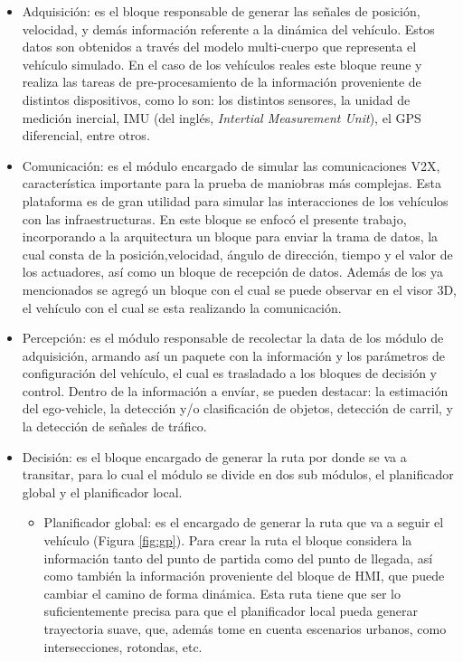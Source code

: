 \begin{itemize}
	\item Adquisición: es el bloque responsable de generar las señales de posición, velocidad, y demás información referente a la dinámica del vehículo. Estos datos son obtenidos a través del modelo multi-cuerpo que representa el vehículo simulado. En el caso de los vehículos reales este bloque reune y realiza las tareas de pre-procesamiento de la información proveniente de distintos dispositivos, como lo son: los distintos sensores, la unidad de medición inercial, IMU (del inglés, \textit{Intertial Measurement Unit}), el GPS diferencial, entre otros.  
	\item Comunicación: es el módulo encargado de simular las comunicaciones V2X, característica importante para la prueba de maniobras más complejas. Esta plataforma es de gran utilidad para simular las interacciones de los vehículos con las infraestructuras. En este bloque se enfocó el presente trabajo, incorporando a la arquitectura un bloque para enviar la trama de datos, la cual consta de la posición,velocidad, ángulo de dirección, tiempo y el valor de los actuadores, así como un bloque de recepción de datos. Además de los ya mencionados se agregó un bloque con el cual se puede observar en el visor 3D, el vehículo con el cual se esta realizando la comunicación.    
	\item Percepción: es el módulo responsable de recolectar la data de los módulo de adquisición, armando así un paquete con la información y los parámetros de configuración del vehículo, el cual es trasladado a los bloques de decisión y control. Dentro de la información a envíar, se pueden destacar: la estimación del ego-vehicle, la detección y/o clasificación de objetos, detección de carril, y la detección de señales de tráfico. 
	\item Decisión: es el bloque encargado de generar la ruta por donde se va a transitar, para lo cual el módulo se divide en dos sub módulos, el planificador global y el planificador local.
	\begin{itemize}
	\item Planificador global: es el encargado de generar la ruta que va a seguir el vehículo (Figura \ref{fig:gp}). Para crear la ruta el bloque considera la información tanto del punto de partida como del punto de llegada, así como también la información proveniente del bloque de HMI, que puede cambiar el camino de forma dinámica. Esta ruta tiene que ser lo suficientemente precisa para que el planificador local pueda generar trayectoria suave, que, además tome en cuenta escenarios urbanos, como intersecciones, rotondas, etc.


\end{itemize}
\end{itemize}
